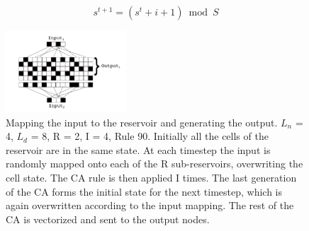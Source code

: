 \documentclass{elsarticle}
\begin{document}
\begin{multicols}{2}
              \begin{equation} \label{eq:input}
              s^{t+1} = (s^t + i + 1) \bmod S
              \end{equation}    


	      \begin{figure}[H]
        \centering
            \includegraphics[width=0.4\textwidth]{Architecture.png}
    \caption{Mapping the input to the reservoir and generating the output.  
        $L_{n}$ = 4, $L_{d}$ = 8, R = 2, I = 4, Rule 90. Initially all the 
            cells of the reservoir are in the same state. At each timestep the 
            input is randomly mapped onto each of the R sub-reservoirs, 
                  overwriting the cell state. The CA rule is then applied I 
                      times. The last generation of the CA forms the initial 
                      state for the next timestep, which is again overwritten 
                      according to the input mapping. The rest of the CA is 
                      vectorized and sent to the output nodes. } 
        
            \label{architecture}
            \end{figure}


\end{multicols}
\end{document}
